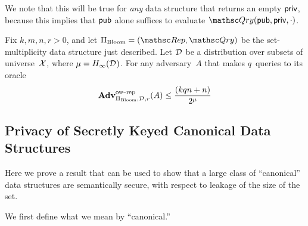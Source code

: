 We note that this will be true for \emph{any} data structure that returns an empty ${\sf priv}$, because this implies that ${\sf pub}$ alone suffices to evaluate $\Qry(\pubaux,\privaux,\cdot)$.  

\begin{theorem}\label{thm3}\label{thm:bf-ow} 
Fix $k,m,n,r>0$, and let $\Pi_{\mathrm{Bloom}}= (\Rep, \Qry)$ be the set-multiplicity data structure just described. Let $\mathcal{D}_{}^{}$ be a distribution over subsets of universe~${\cal X}$, where $\mu = H_\infty(\mathcal{D}_{}^{})$.  For any adversary~$A$ that makes $q$~queries to its oracle
\[
\mathrm{\mathbf{Adv}}^{\mathrm{ow\mbox{-}rep}}_{\Pi_{\mathrm{Bloom}},\mathcal{D}_{}^{},r}(A) \leq  \frac{(kqn+n)}{2^{\mu}}
\]
\end{theorem}


\subsection{Privacy of Secretly Keyed Canonical Data Structures}
Here we prove a result that can be used to show that a large class of ``canonical''
data structures are semantically secure, with respect to leakage of the size of the set.

We first define what we mean by ``canonical.''


